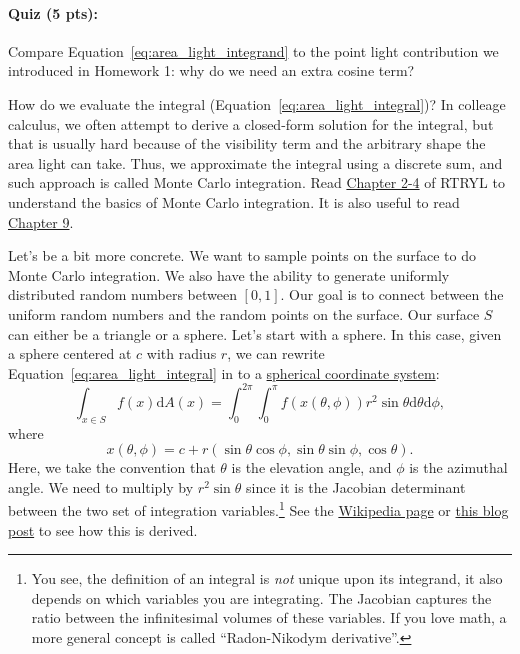 \paragraph{Quiz (5 pts):} Compare Equation~\eqref{eq:area_light_integrand} to the point light contribution we introduced in Homework 1: why do we need an extra cosine term?

How do we evaluate the integral (Equation~\eqref{eq:area_light_integral})? In colleage calculus, we often attempt to derive a closed-form solution for the integral, but that is usually hard because of the visibility term and the arbitrary shape the area light can take. Thus, we approximate the integral using a discrete sum, and such approach is called Monte Carlo integration. Read \href{https://raytracing.github.io/books/RayTracingTheRestOfYourLife.html#asimplemontecarloprogram}{Chapter 2-4} of RTRYL to understand the basics of Monte Carlo integration. It is also useful to read \href{https://raytracing.github.io/books/RayTracingTheRestOfYourLife.html#samplinglightsdirectly}{Chapter 9}.

Let's be a bit more concrete. We want to sample points on the surface to do Monte Carlo integration.
We also have the ability to generate uniformly distributed random numbers between $[0, 1]$. Our goal is to connect between the uniform random numbers and the random points on the surface.
Our surface $S$ can either be a triangle or a sphere. Let's start with a sphere. In this case, given a sphere centered at $c$ with radius $r$, we can rewrite Equation~\eqref{eq:area_light_integral} in to a \href{https://en.wikipedia.org/wiki/Spherical_coordinate_system}{spherical coordinate system}:
\begin{equation}
    \int_{x \in S} f(x) \mathrm{d}A(x) = \int_{0}^{2\pi}\int_{0}^{\pi} f(x(\theta, \phi)) r^2 \sin\theta \mathrm{d}\theta \mathrm{d} \phi,
    \label{eq:area_light_spherical}
\end{equation}
where
\begin{equation}
    x(\theta, \phi) = c + r \left(\sin\theta \cos\phi, \sin\theta \sin\phi, \cos\theta \right).
\end{equation}
Here, we take the convention that $\theta$ is the elevation angle, and $\phi$ is the azimuthal angle. We need to multiply by $r^2 \sin\theta$ since it is the Jacobian determinant between the two set of integration variables.\footnote{You see, the definition of an integral is \emph{not} unique upon its integrand, it also depends on which variables you are integrating. The Jacobian captures the ratio between the infinitesimal volumes of these variables. If you love math, a more general concept is called ``Radon-Nikodym derivative''.} See the \href{https://en.wikipedia.org/wiki/Spherical_coordinate_system#Integration_and_differentiation_in_spherical_coordinates}{Wikipedia page} or \href{http://6degreesoffreedom.co/circle-random-sampling/}{this blog post} to see how this is derived.

